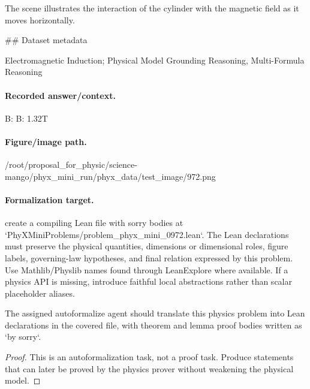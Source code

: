 The scene illustrates the interaction of the cylinder with the magnetic field as it moves horizontally.

\#\# Dataset metadata

Electromagnetic Induction; Physical Model Grounding Reasoning, Multi-Formula Reasoning

\paragraph{Recorded answer/context.}
B: B: 1.32T

\paragraph{Figure/image path.}
/root/proposal\_for\_physic/science-mango/phyx\_mini\_run/phyx\_data/test\_image/972.png

\paragraph{Formalization target.}
create a compiling Lean file with sorry bodies at `PhyXMiniProblems/problem\_phyx\_mini\_0972.lean`. The Lean declarations must preserve the physical quantities, dimensions or dimensional roles, figure labels, governing-law hypotheses, and final relation expressed by this problem.
Use Mathlib/Physlib names found through LeanExplore where available. If a physics API is missing, introduce faithful local abstractions rather than scalar placeholder aliases.

\begin{theorem}
\label{thm:physics:phyx_mini_0972:target}
The assigned autoformalize agent should translate this physics problem into Lean declarations in the covered file, with theorem and lemma proof bodies written as `by sorry`.
\end{theorem}
\begin{proof}
This is an autoformalization task, not a proof task. Produce statements that can later be proved by the physics prover without weakening the physical model.
\end{proof}

